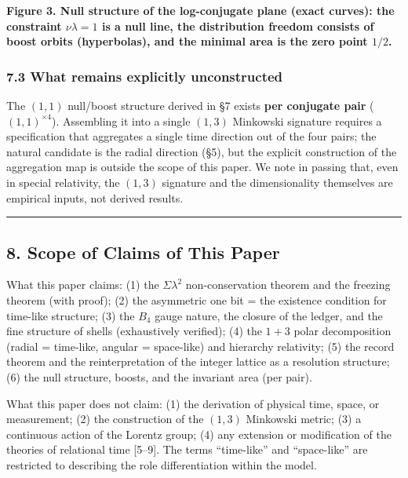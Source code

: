 \documentclass[
]{article}
\begin{document}
\textbf{Figure 3. Null structure of the log-conjugate plane (exact
curves): the constraint \(\nu\lambda=1\) is a null line, the
distribution freedom consists of boost orbits (hyperbolas), and the
minimal area is the zero point \(1/2\).}

\subsubsection{7.3 What remains explicitly
unconstructed}\label{what-remains-explicitly-unconstructed}

The \((1,1)\) null/boost structure derived in §7 exists \textbf{per
conjugate pair} (\((1,1)^{\times4}\)). Assembling it into a single
\((1,3)\) Minkowski signature requires a specification that aggregates a
single time direction out of the four pairs; the natural candidate is
the radial direction (§5), but the explicit construction of the
aggregation map is outside the scope of this paper. We note in passing
that, even in special relativity, the \((1,3)\) signature and the
dimensionality themselves are empirical inputs, not derived results.

\begin{center}\rule{0.5\linewidth}{0.5pt}\end{center}

\subsection{8. Scope of Claims of This
Paper}\label{scope-of-claims-of-this-paper}

What this paper claims: (1) the \(\Sigma\lambda^2\) non-conservation
theorem and the freezing theorem (with proof); (2) the asymmetric one
bit = the existence condition for time-like structure; (3) the \(B_4\)
gauge nature, the closure of the ledger, and the fine structure of
shells (exhaustively verified); (4) the \(1{+}3\) polar decomposition
(radial = time-like, angular = space-like) and hierarchy relativity; (5)
the record theorem and the reinterpretation of the integer lattice as a
resolution structure; (6) the null structure, boosts, and the invariant
area (per pair).

What this paper does not claim: (1) the derivation of physical time,
space, or measurement; (2) the construction of the \((1,3)\) Minkowski
metric; (3) a continuous action of the Lorentz group; (4) any extension
or modification of the theories of relational time {[}5--9{]}. The terms
``time-like'' and ``space-like'' are restricted to describing the role
differentiation within the model.
\end{document}
